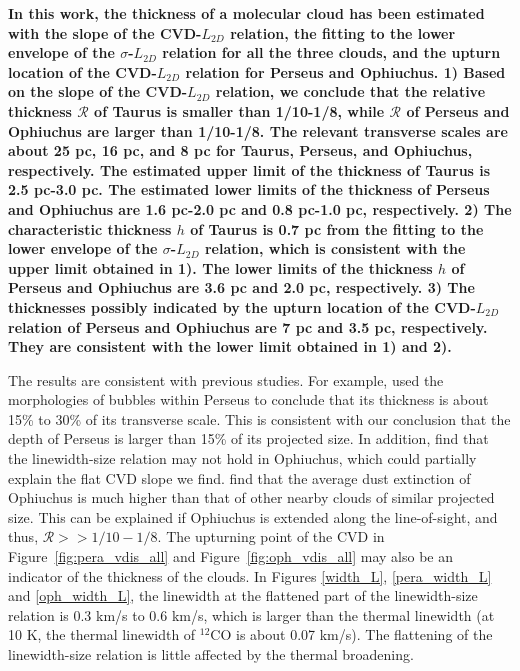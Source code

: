 \documentclass[iop,revtex4]{emulateapj}
\begin{document}
{\bf In this work, the thickness of a molecular cloud has been estimated with the slope of the CVD-$L_{2D}$ relation, the fitting to the lower envelope of the $\sigma$-$L_{2D}$ relation for all the three clouds, and the upturn location of the CVD-$L_{2D}$ relation for Perseus and Ophiuchus. 1) Based on the slope of the CVD-$L_{2D}$ relation, we conclude that the relative thickness $\mathcal{R}$ of Taurus is smaller than 1/10-1/8, while $\mathcal{R}$ of Perseus and Ophiuchus are larger than 1/10-1/8. The relevant transverse scales are about 25 pc, 16 pc, and 8 pc for Taurus, Perseus, and Ophiuchus, respectively. The estimated upper limit of the thickness of Taurus  is 2.5 pc-3.0 pc. The estimated lower limits of the thickness of Perseus and Ophiuchus are 1.6 pc-2.0 pc and 0.8 pc-1.0 pc, respectively. 2) The characteristic thickness $h$ of Taurus is 0.7 pc from the fitting to the lower envelope of the $\sigma$-$L_{2D}$ relation, which is consistent with the upper limit obtained in 1). The lower limits of the thickness $h$ of Perseus and Ophiuchus are 3.6 pc and 2.0 pc, respectively. 3) The thicknesses possibly indicated by the upturn location of the CVD-$L_{2D}$ relation of Perseus and Ophiuchus are 7 pc and 3.5 pc, respectively. They are consistent with the lower limit obtained in 1) and 2).
}

The results are consistent with previous studies. For example, \cite{Arce2011} used the morphologies of bubbles within Perseus to conclude that its thickness is about 15\% to 30\% of its transverse scale. This is consistent with our conclusion that the depth of Perseus is larger than 15\% of its projected size. In addition, \citep{Loren1989b} find that the linewidth-size relation may not hold in Ophiuchus, which could partially explain the flat CVD slope we find. \citet{observe_lognormal} find that the average dust extinction of Ophiuchus is much higher than that of other nearby clouds of similar projected size. This can be explained if Ophiuchus is extended along the line-of-sight, and thus, $\mathcal{R}>>1/10-1/8$. The upturning point of the CVD in Figure~\ref{fig:pera_vdis_all} and Figure~\ref{fig:oph_vdis_all} may also be an indicator of the thickness of the clouds. In Figures \ref{width_L}, \ref{pera_width_L} and \ref{oph_width_L}, the linewidth at the flattened part of the linewidth-size relation is 0.3 km/s to 0.6 km/s, which is larger than the thermal linewidth (at 10 K, the thermal linewidth of $^{12}$CO is about 0.07 km/s). The flattening of the linewidth-size relation is little affected by the thermal broadening.
\end{document}

